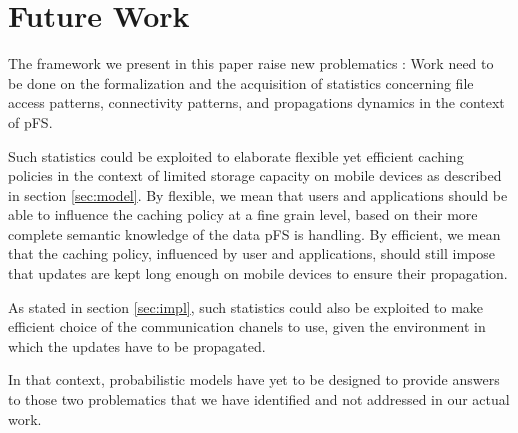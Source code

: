 
\section{Future Work}
\label{sec:futwk}

The framework we present in this paper raise new problematics : Work
need to be done on the formalization and the acquisition of statistics
concerning file access patterns, connectivity patterns, and
propagations dynamics in the context of pFS. 

Such statistics could be exploited to elaborate flexible yet efficient
caching policies in the context of limited storage capacity on mobile
devices as described in section \ref{sec:model}. By flexible, we mean
that users and applications should be able to influence the caching
policy at a fine grain level, based on their more complete semantic
knowledge of the data pFS is handling. By efficient, we mean that the
caching policy, influenced by user and applications, should still
impose that updates are kept long enough on mobile devices to ensure
their propagation.

As stated in section \ref{sec:impl}, such statistics could also be
exploited to make efficient choice of the communication chanels to
use, given the environment in which the updates have to be propagated.

In that context, probabilistic models have yet to be designed to
provide answers to those two problematics that we have identified and
not addressed in our actual work.


